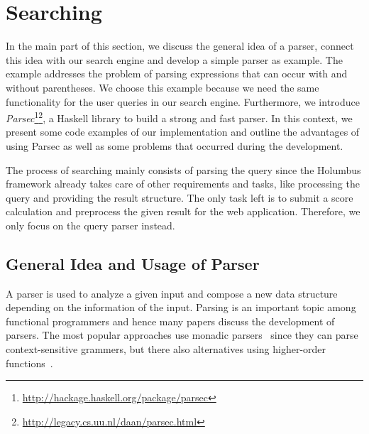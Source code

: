 \documentclass[%
	latex,%
	a4paper,%
	oneside,%
	chapterprefix,%
	headsepline,%
	12pt%
]{scrbook}
\begin{document}



 
\section{Searching}\label{implementation:parser}

In the main part of this section, we discuss the general idea of a
parser, connect this idea with our search engine and develop a simple
parser as example. %
The example addresses the problem of parsing expressions that can
occur with and without parentheses. %
We choose this example because we need the same functionality for the
user queries in our search engine. %
Furthermore, we introduce
\emph{Parsec}\footnote{\url{http://hackage.haskell.org/package/parsec}}\footnote{\url{http://legacy.cs.uu.nl/daan/parsec.html}},
a Haskell library to build a strong and fast parser. %
In this context, we present some code examples of our implementation
and outline the advantages of using Parsec as well as some problems
that occurred during the development. %

The process of searching mainly consists of parsing the query since
the Holumbus framework already takes care of other requirements and
tasks, like processing the query and providing the result structure. %
The only task left is to submit a score calculation and preprocess the
given result for the web application. %
Therefore, we only focus on the query parser instead. %

\subsection{General Idea and Usage of Parser}

A parser is used to analyze a given input and compose a new data
structure depending on the information of the input. %
Parsing is an important topic among functional programmers and hence
many papers discuss the development of parsers. %
The most popular approaches use monadic parsers~\cite{monpars} since
they can parse context-sensitive grammers, but there also alternatives
using higher-order functions~\cite{funcpar}. %
\end{document}
